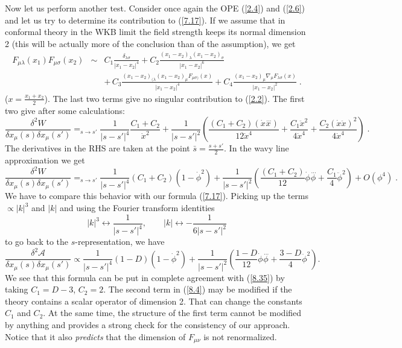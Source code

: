 \documentclass[a4paper,12pt]{article}
\numberwithin{equation}{section}
\begin{document}
Now let us perform another test. Consider once again the OPE (\ref{2.4}) and
(\ref{2.6}) and let us try to determine its contribution to (\ref{7.17}).
If we assume that in conformal theory in the WKB limit the field strength keeps
its normal dimension 2 (this will be actually more of the conclusion than of
the assumption), we get
\begin{eqnarray}
F_{\mu \lambda }(x_{1})F_{\mu \sigma }(x_{2}) & \sim  & C_{1}\frac{\delta _{\lambda \sigma }}{|x_{1}-x_{2}|^{4}}+C_{2}\frac{(x_{1}-x_{2})_{\lambda }(x_{1}-x_{2})_{\sigma }}{|x_{1}-x_{2}|^{6}}\nonumber \\
 &  & +\, C_{3}\frac{(x_{1}-x_{2})_{(\lambda }(x_{1}-x_{2})_{\mu }F_{\mu \sigma )}(x)}{|x_{1}-x_{2}|^{4}}+C_{4}\frac{(x_{1}-x_{2})_{\mu }\nabla _{\mu }F_{\lambda \sigma }(x)}{\left| x_{1}-x_{2}\right| ^{2}}\; .\label{8.2} 
\end{eqnarray}
(\( x=\frac{x_{1}+x_{2}}{2} \)). The last two terms give no singular contribution
to (\ref{2.2}). The first two give after some calculations:
\[
\frac{\delta ^{2}W}{\delta x_{\mu }(s)\delta x_{\mu }(s')}\mathop {=}_{s\to s'}\frac{1}{|s-s'|^{4}}\frac{C_{1}+C_{2}}{\dot{x}^{2}}+\frac{1}{|s-s'|^{2}}\left( \frac{(C_{1}+C_{2})(\dot{x}\! \stackrel{{\, ...}}{x})}{12\dot{x}^{4}}+\frac{C_{1}\ddot{x}^{2}}{4\dot{x}^{4}}+\frac{C_{2}(\dot{x}\ddot{x})^{2}}{4\dot{x}^{4}}\right) \; .\]
The derivatives in the RHS are taken at the point \( \bar{s}=\frac{s+s'}{2}. \)
In the wavy line approximation we get
\begin{equation}
\label{8.35}
\frac{\delta ^{2}W}{\delta x_{\mu }(s)\delta x_{\mu }(s')}\mathop {=}_{s\to s'}\frac{1}{|s-s'|^{4}}(C_{1}+C_{2})(1-\dot{\phi }^{2})+\frac{1}{|s-s'|^{2}}\left( \frac{(C_{1}+C_{2})}{12}\dot{\phi }\stackrel{{\, ...}}{\phi }+\frac{C_{1}}{4}\ddot{\phi }^{2}\right) +O(\phi ^{4})\; .
\end{equation}
 We have to compare this behavior with our formula (\ref{7.17}). Picking up
the terms \( \propto |k|^{3} \) and \( |k| \) and using the Fourier transform
identities
\[
|k|^{3}\leftrightarrow \frac{1}{|s-s'|^{4}},\qquad |k|\leftrightarrow -\frac{1}{6|s-s'|^{2}}\]
 to go back to the \( s \)-representation, we have
\begin{equation}
\label{8.4}
\frac{\delta ^{2}\mathcal{A}}{\delta x_{\mu }(s)\delta x_{\mu }(s')}\propto \frac{1}{|s-s'|^{4}}(1-D)(1-\dot{\phi }^{2})+\frac{1}{|s-s'|^{2}}\left( \frac{1-D}{12}\dot{\phi }\stackrel{{\, ...}}{\phi }+\frac{3-D}{4}\ddot{\phi }^{2}\right) .
\end{equation}
 We see that this formula can be put in complete agreement with (\ref{8.35})
by taking \( C_{1}=D-3 \), \( C_{2}=2 \). The second term in (\ref{8.4})
may be modified if the theory contains a scalar operator of dimension 2. That
can change the constants \( C_{1} \) and \( C_{2} \). At the same time, the
structure of the first term cannot be modified by anything and provides a strong
check for the consistency of our approach. Notice that it also \emph{predicts}
that the dimension of \( F_{\mu \nu } \) is not renormalized.
\end{document}
